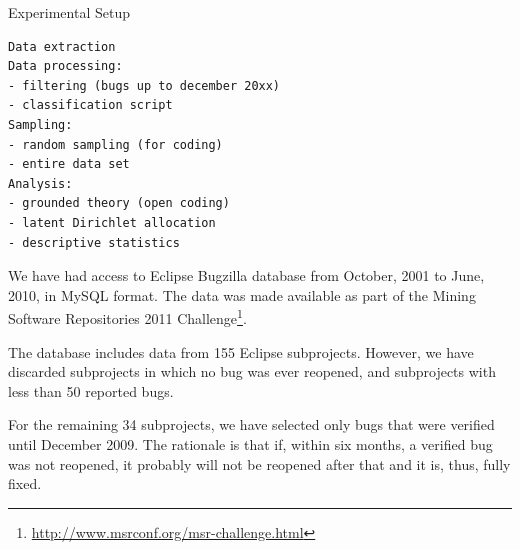 \begin{section}{Experimental Setup}

\begin{verbatim}
Data extraction
Data processing: 
- filtering (bugs up to december 20xx)
- classification script
Sampling:
- random sampling (for coding)
- entire data set
Analysis:
- grounded theory (open coding)
- latent Dirichlet allocation
- descriptive statistics
\end{verbatim}

We have had access to Eclipse Bugzilla database from October, 2001 to June, 2010, in MySQL format. The data was made available as part of the Mining Software Repositories 2011 Challenge\footnote{\url{http://www.msrconf.org/msr-challenge.html}}.

The database includes data from 155 Eclipse subprojects. However, we have discarded subprojects in which no bug was ever reopened, and subprojects with less than 50 reported bugs.

For the remaining 34 subprojects, we have selected only bugs that were verified until December 2009. The rationale is that if, within six months, a verified bug was not reopened, it probably will not be reopened after that and it is, thus, fully fixed.
\end{section}

